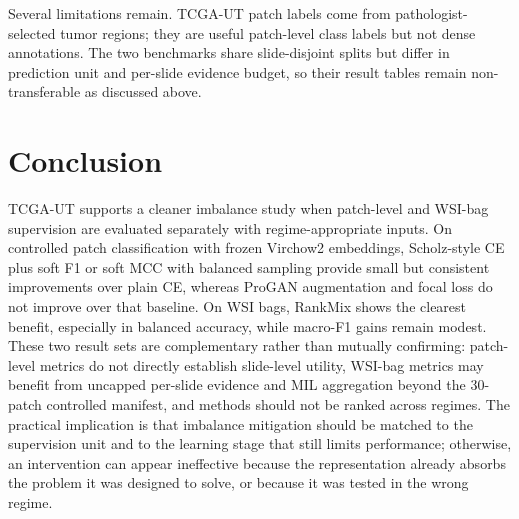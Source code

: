 \documentclass[11pt]{article}
\begin{document}
Several limitations remain. TCGA-UT patch labels come from pathologist-selected tumor regions; they are useful patch-level class labels but not dense annotations. The two benchmarks share slide-disjoint splits but differ in prediction unit and per-slide evidence budget, so their result tables remain non-transferable as discussed above.

\section{Conclusion}
TCGA-UT supports a cleaner imbalance study when patch-level and WSI-bag supervision are evaluated separately with regime-appropriate inputs. On controlled patch classification with frozen Virchow2 embeddings, Scholz-style CE plus soft F1 or soft MCC with balanced sampling provide small but consistent improvements over plain CE, whereas ProGAN augmentation and focal loss do not improve over that baseline. On WSI bags, RankMix shows the clearest benefit, especially in balanced accuracy, while macro-F1 gains remain modest. These two result sets are complementary rather than mutually confirming: patch-level metrics do not directly establish slide-level utility, WSI-bag metrics may benefit from uncapped per-slide evidence and MIL aggregation beyond the 30-patch controlled manifest, and methods should not be ranked across regimes. The practical implication is that imbalance mitigation should be matched to the supervision unit and to the learning stage that still limits performance; otherwise, an intervention can appear ineffective because the representation already absorbs the problem it was designed to solve, or because it was tested in the wrong regime.

\clearpage


\end{document}
